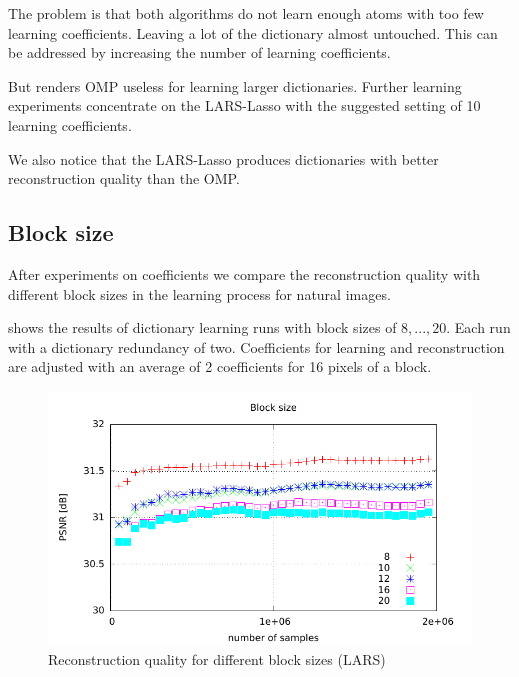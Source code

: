 The problem is that both algorithms do not learn enough atoms with too few
learning coefficients. Leaving a lot of the dictionary almost untouched. This
can be addressed by increasing the number of learning coefficients.

But renders OMP useless for learning larger dictionaries. Further learning
experiments concentrate on the LARS-Lasso with the suggested setting of 10
learning coefficients.


We also notice that the LARS-Lasso produces dictionaries with better
reconstruction quality than the OMP.



\newpage
\subsection{Block size}
After experiments on coefficients we compare the reconstruction quality
with different block sizes in the learning process for natural images. 

 shows the results of dictionary
learning runs with block sizes of $8,...,20$. 
Each run with a dictionary redundancy of two. Coefficients for learning
and reconstruction are adjusted with an average of 2 coefficients for 16 pixels
of a block.

\begin{figure}[h]
\centering
\includegraphics[width =
1.0\textwidth]{../tests/results/blockSizeConverg.pdf}
\caption{Reconstruction quality for different block sizes (LARS)}
\label{fig:blockSize}
\end{figure}

